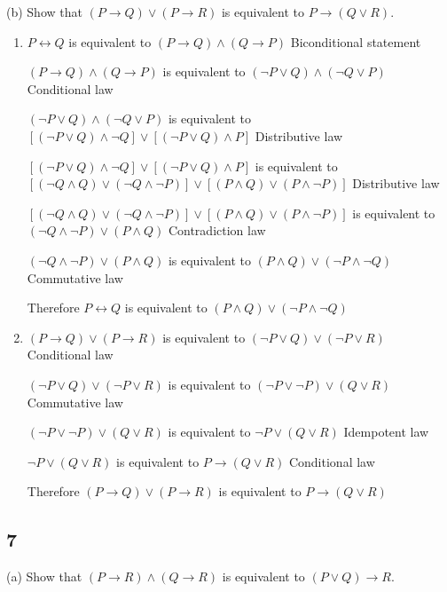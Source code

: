 \documentclass{article}
\begin{document}
(b) Show that $(P \rightarrow Q) \lor (P \rightarrow R)$ is equivalent to $P \rightarrow (Q \lor R)$.
\begin{enumerate} [label=(\alph*)]
    \item 
    $P \leftrightarrow Q$ is equivalent to $(P \rightarrow Q) \land (Q \rightarrow P)$ Biconditional statement
    
    $(P \rightarrow Q) \land (Q \rightarrow P)$ is equivalent to $(\neg P \lor Q) \land (\neg Q \lor P)$ Conditional law
    
    $(\neg P \lor Q) \land (\neg Q \lor P)$ is equivalent to $[(\neg P \lor  Q ) \land  \neg Q]\lor [(\neg P \lor Q )\land P]$ Distributive law
    
    $[(\neg P \lor  Q ) \land  \neg Q]\lor [(\neg P \lor Q )\land P]$ is equivalent to $[(\neg Q \land Q)\lor (\neg Q \land \neg P)]\lor[(P \land Q)\lor(P \land \neg P)]$ Distributive law
    
    $[(\neg Q \land Q)\lor (\neg Q \land \neg P)]\lor[(P \land Q)\lor(P \land \neg P)]$ is equivalent to $(\neg Q \land \neg P) \lor (P \land Q)$ Contradiction law
    
    $(\neg Q \land \neg P) \lor (P \land Q)$ is equivalent to $(P \land Q) \lor (\neg P \land \neg Q)$ Commutative law
    
    Therefore $P \leftrightarrow Q$ is equivalent to $(P \land Q) \lor (\neg P \land \neg Q)$
    \item
    $(P \rightarrow Q) \lor (P \rightarrow R)$ is equivalent to $(\neg P \lor Q) \lor (\neg P \lor R)$ Conditional law
    
    $(\neg P \lor Q) \lor (\neg P \lor R)$ is equivalent to $(\neg P \lor \neg P ) \lor (Q \lor R)$ Commutative law
    
    $(\neg P \lor \neg P ) \lor (Q \lor R)$ is equivalent to $\neg P \lor (Q \lor R)$ Idempotent law
    
    $\neg P \lor (Q \lor R)$ is equivalent to $P \rightarrow (Q \lor R)$ Conditional law
    
    Therefore $(P \rightarrow Q) \lor (P \rightarrow R)$ is equivalent to $P \rightarrow (Q \lor R)$
\end{enumerate}
\subsection{7}
(a) Show that $(P \rightarrow R) \land (Q \rightarrow R)$ is equivalent to $(P \lor Q) \rightarrow R$.
\end{document}
